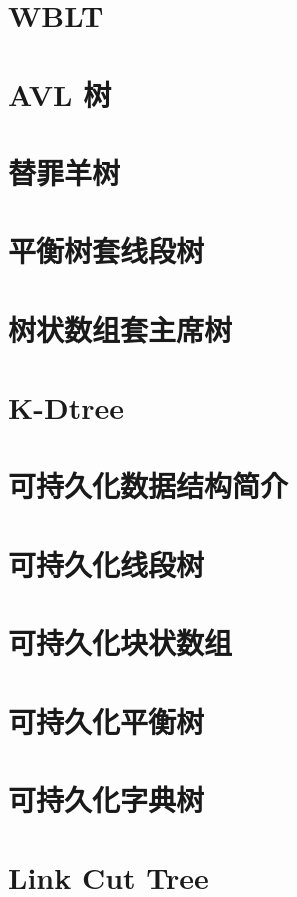 \section{WBLT}

\section{AVL 树}

\section{替罪羊树}

  
  \section{平衡树套线段树}
  
  
  \section{树状数组套主席树}
  
\section{K-Dtree}

  \section{可持久化数据结构简介}
  
  \section{可持久化线段树}
  
  \section{可持久化块状数组}
  
  \section{可持久化平衡树}
  
  \section{可持久化字典树}
  
\section{Link Cut Tree}

